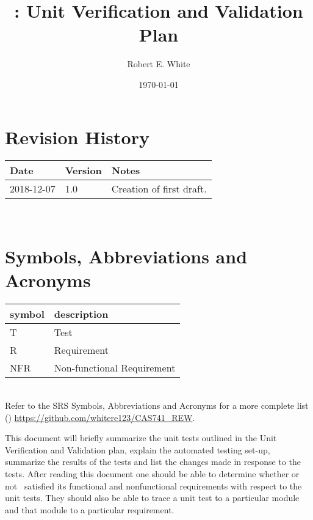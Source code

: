 \documentclass[12pt, titlepage]{article}
\begin{document}
\title{\progname: Unit Verification and Validation Plan} 
\author{Robert E. White}
\date{\today}
	
\maketitle


\section{Revision History}

\begin{tabularx}{\textwidth}{p{3cm}p{2cm}X}
\toprule {\bf Date} & {\bf Version} & {\bf Notes}\\
\midrule
2018-12-07 & 1.0 & Creation of first draft.\\
\bottomrule
\end{tabularx}

~\newpage

\section{Symbols, Abbreviations and Acronyms}

\renewcommand{\arraystretch}{1.2}
\begin{tabular}{l l} 
	\toprule		
	\textbf{symbol} & \textbf{description}\\
	\midrule 
	T & Test\\
	R & Requirement\\ 
	NFR & Non-functional Requirement\\
	\bottomrule
\end{tabular}\\

Refer to the SRS Symbols, Abbreviations and Acronyms for a more 
complete list (\cite{SRS}) \url{https://github.com/whitere123/CAS741_REW}. 

\newpage

\tableofcontents

\listoftables %

\listoffigures %

\newpage


This document will briefly summarize the unit tests outlined in the Unit 
Verification and Validation plan, explain the automated testing set-up, 
summarize the results of the tests and list the changes made in response to the 
tests. After reading this document one should be able to determine whether or 
not \progname \ satisfied its functional and nonfunctional requirements with 
respect to the unit tests. They should also be able to trace a unit test to a 
particular module and that module to a particular requirement. 
\end{document}
